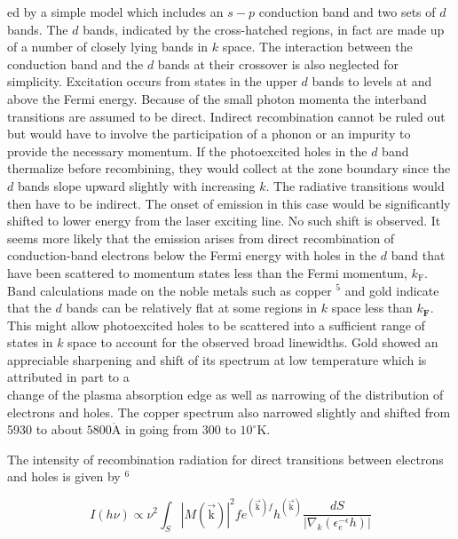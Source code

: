 \documentclass[10pt]{article}
\def\AA{\mathring{\mathrm{A}}}
\begin{document}
ed by a simple model which includes an $s-p$ conduction band and two sets of $d$ bands. The $d$ bands, indicated by the cross-hatched regions, in fact are made up of a number of closely lying bands in $k$ space. The interaction between the conduction band and the $d$ bands at their crossover is also neglected for simplicity. Excitation occurs from states in the upper $d$ bands to levels at and above the Fermi energy. Because of the small photon momenta the interband transitions are assumed to be direct. Indirect recombination cannot be ruled out but would have to involve the participation of a phonon or an impurity to provide the necessary momentum. If the photoexcited holes in the $d$ band thermalize before recombining, they would collect at the zone boundary since the $d$ bands slope upward slightly with increasing $k$. The radiative transitions would then have to be indirect. The onset of emission in this case would be significantly shifted to lower energy from the laser exciting line. No such shift is observed. It seems more likely that the emission arises from direct recombination of conduction-band electrons below the Fermi energy with holes in the $d$ band that have been scattered to momentum states less than the Fermi momentum, $k_{\mathrm{F}}$. Band calculations made on the noble metals such as copper ${ }^{5}$ and gold indicate that the $d$ bands can be relatively flat at some regions in $k$ space less than $k_{\mathbf{F}}$. This might allow photoexcited holes to be scattered into a sufficient range of states in $k$ space to account for the observed broad linewidths. Gold showed an appreciable sharpening and shift of its spectrum at low temperature which is attributed in part to a\\
change of the plasma absorption edge as well as narrowing of the distribution of electrons and holes. The copper spectrum also narrowed slightly and shifted from 5930 to about $5800 \AA$ in going from 300 to $10^{\circ} \mathrm{K}$.

The intensity of recombination radiation for direct transitions between electrons and holes is given by ${ }^{6}$


\begin{equation*}
I(h \nu) \propto \nu^{2} \int_{S}|M(\overrightarrow{\mathrm{k}})|^{2} f e^{(\overrightarrow{\mathrm{k}}) f} h^{(\overrightarrow{\mathrm{k}})} \frac{d S}{\left|\nabla_{k}\left(\epsilon_{e}^{-\epsilon} h\right)\right|} \tag{1}
\end{equation*}
\end{document}
